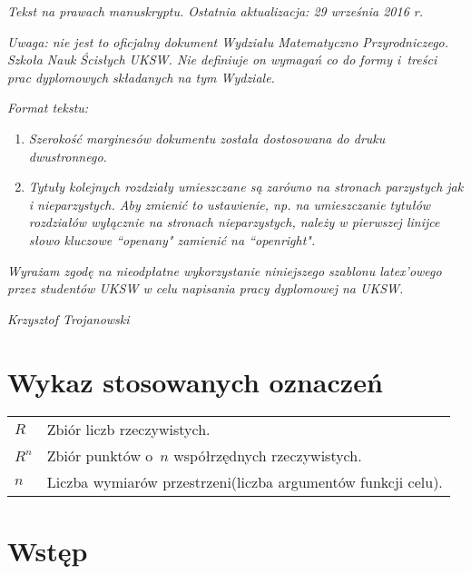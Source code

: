 \documentclass[final,a4paper,openany,12pt]{mwbk}
\begin{document}
\newpage

\emph{Tekst na prawach manuskryptu. Ostatnia aktualizacja: 29 września 2016 r.}
\vspace{2mm}

\emph{Uwaga: nie jest to oficjalny dokument Wydziału Matematyczno Przyrodniczego. Szkoła Nauk Ścisłych UKSW. Nie definiuje on wymagań co do formy i~treści prac dyplomowych składanych na tym Wydziale.}
\vspace{2mm}

\emph{Format tekstu:} 
\begin{enumerate}
\item \emph{Szerokość marginesów dokumentu została dostosowana do druku dwustronnego. }
\item \emph{Tytuły kolejnych rozdziały umieszczane są zarówno na stronach parzystych jak i nieparzystych. Aby zmienić to ustawienie, np. na umieszczanie tytułów rozdziałów wyłącznie na stronach nieparzystych, należy w pierwszej linijce słowo kluczowe ``openany" zamienić na ``openright".}
\end{enumerate}
\vspace{20mm}

\emph{Wyrażam zgodę na nieodpłatne wykorzystanie niniejszego szablonu latex’owego przez studentów UKSW w celu napisania pracy dyplomowej na UKSW. }
\vspace{2mm}

\hspace{10cm}\emph{Krzysztof Trojanowski}


\thispagestyle{empty}
\mbox{}

\tableofcontents
\listoffigures
\listoftables
\listofalgorithms

\sloppy

\chapter*{Wykaz stosowanych oznaczeń}

\begin{tabular}{ll}
$R$	&	Zbiór liczb rzeczywistych.\\
$R^n$	&	Zbiór punktów o~$n$ współrzędnych rzeczywistych.\\
$n$	&	Liczba wymiarów przestrzeni(liczba argumentów funkcji celu).\\
\end{tabular}

\chapter*{Wstęp}
\end{document}
